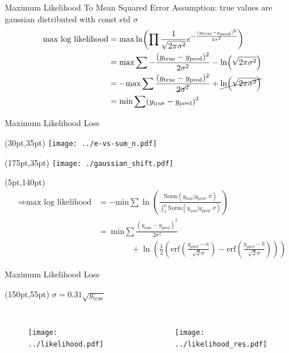 \documentclass[10pt]{beamer}
\begin{document}
\begin{frame}{Maximum Likelihood To Mean Squared Error}
Assumption: true values are gaussian distributed with const std $\sigma$
  \begin{align*}
    \text{max log likelihood} &= \text{max} \ln( \prod \frac{1}{\sqrt{2\pi \sigma^2}} e^{-\frac{(y_{\text{true}}-y_{\text{pred}})^2}{2 \sigma^2}}) \\
                              & =\text{max} \sum -\frac{(y_{\text{true}}-y_{\text{pred}})^2}{2 \sigma^2} - \ln(\sqrt{2\pi \sigma^2}) \\
                              & =-\text{max} \sum\frac{(y_{\text{true}}-y_{\text{pred}})^2}{\cancel{2 \sigma^2}} + \cancel{\ln(\sqrt{2\pi \sigma^2})} \\
                              & = \text{min} \sum (y_{\text{true}}-y_{\text{pred}})^2
  \end{align*}
\end{frame}

\begin{frame}{Maximum Likelihood Loss}
  \begin{textblock*}{150pt}(30pt,35pt)
      \texttt{[image: ../e-vs-sum\_n.pdf]}
  \end{textblock*}
  \begin{textblock*}{150pt}(175pt,35pt)
    \texttt{[image: ./gaussian\_shift.pdf]}
  \end{textblock*}

  \begin{textblock*}{150pt}(5pt,140pt)
    \begin{align*}
      \Rightarrow \text{max log likelihood} &= -\text{min} \sum \ln(\frac{\text{Norm}(y_{\text{true}} | y_{\text{pred}}, \sigma)}{\int^b_a \text{Norm}(y_{\text{true}} | y_{\text{pred}}, \sigma)})\\
                                            &=\ \text{min} \sum \frac{(y_{\text{true}}-y_{\text{pred}})^2}{2 \sigma^2}\\
   &\qquad \qquad +\ln(\frac{1}{2} \left(\text{erf}(\frac{y_{\text{pred}}-a}{\sqrt{2}\sigma}) - \text{erf}(\frac{y_{\text{pred}}-b}{\sqrt{2}\sigma})\right))
    \end{align*}
  \end{textblock*}
\end{frame}

\begin{frame}{Maximum Likelihood Loss}
  \begin{textblock*}{150pt}(150pt,55pt)
    $\sigma = 0.31 \sqrt{y_{\text{true}}}$
  \end{textblock*}
  \begin{columns}
    \begin{figure}[htp]
      \texttt{[image: ../likelihood.pdf]}
    \end{figure}
    \begin{figure}[htp]
      \texttt{[image: ../likelihood\_res.pdf]}
    \end{figure}
  \end{columns}
\end{frame}
\end{document}
